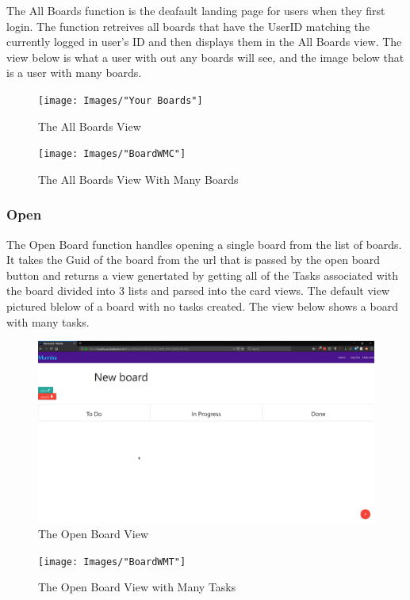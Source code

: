 \documentclass[letterpaper]{article}
\begin{document}
The All Boards function is the deafault landing page for users when they first login. The function retreives all boards that have the UserID matching the currently logged in user's ID and then displays them in the All Boards view. The view below is what a user with out any boards will see, and the image below that is a user with many boards.

\begin{figure}[H]
  \centering
  \caption{The All Boards View}
  \texttt{[image: Images/"Your Boards"]}
\end{figure}

\begin{figure}[H]
  \centering
  \caption{The All Boards View With Many Boards}
  \texttt{[image: Images/"BoardWMC"]}
\end{figure}

\pagebreak

\subsubsection{Open}

The Open Board function handles opening a single board from the list of boards. It takes the Guid of the board from the url that is passed by the open board button and returns a view  genertated by getting all of the Tasks associated with the board divided into 3 lists and parsed into the card views. The default view pictured blelow of a board with no tasks created. The view below shows a board with many tasks.

\begin{figure}[H]
  \centering
  \caption{The Open Board View}
  \includegraphics[scale=0.2]{Images/BlankBoard}
\end{figure}

\begin{figure}[H]
  \centering
  \caption{The Open Board View with Many Tasks}
  \texttt{[image: Images/"BoardWMT"]}
\end{figure}
\pagebreak
\end{document}
